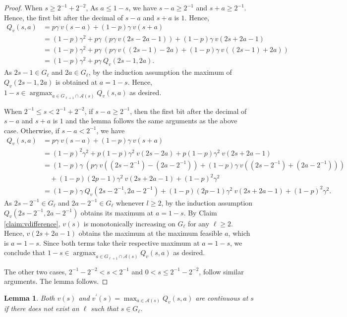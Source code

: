\documentclass{article}
\newtheorem{lemma}[theorem]{Lemma}
\theoremstyle{named}
\DeclareMathOperator*{\argmax}{arg max}
\newcommand{\cA}{\mathcal{A}}
\begin{document}
\begin{proof}
When $s \geq 2^{-1}+2^{-2}$, As $a\leq 1-s$, we have $s-a\geq 2^{-1}$ and $s+a\geq 2^{-1}$. Hence, the first bit after the decimal of $s-a$ and $s+a$ is $1$. 
Hence, 
\begin{align*}
Q_v(s,a) & = p\gamma\ v(s-a) + (1-p)\gamma\ v(s+a)\\
& = (1-p)\gamma^2 + p\gamma\ (p\gamma\ v(2s-2a-1)) + (1-p)\gamma\ v(2s+2a-1) \\
& = (1-p)\gamma^2 +  p\gamma\ (p\gamma\ v((2s-1)-2a) + (1-p)\gamma\ v((2s-1)+2a))\\
& = (1-p)\gamma^2 + p\gamma\ Q_v(2s-1,2a).
\end{align*}
As $2s-1\in G_\ell$ and $2a\in G_\ell$, by the induction assumption the maximum of $Q_v(2s-1,2a)$ is obtained at $a=1-s$. Hence, $1-s\in\argmax_{a\in G_{\ell+1}\cap \cA(s)}Q_v(s,a)$ as desired.

When $2^{-1} \le s < 2^{-1}+2^{-2}$, if $s-a\geq 2^{-1}$, then the first bit after the decimal of $s-a$ and $s+a$ is $1$ and the lemma follows the same arguments as the above case. Otherwise, if $s-a< 2^{-1}$, we have
\begin{align*}
Q_v(s,a) & = p\gamma\ v(s-a) + (1-p)\gamma\ v(s+a)\\ 
& = (1-p)^2\gamma^2 + p(1-p)\gamma^2\ v(2s-2a) + p(1-p)\gamma^2\  v(2s+2a-1)\\
& = (1-p)\gamma\ (p\gamma\ v((2s-2^{-1})-(2a-2^{-1}))+(1-p)\gamma\ v((2s-2^{-1})+(2a-2^{-1}))) \\
& \quad + (1-p)(2p-1)\gamma^2\ v(2s+2a-1) + (1-p)^2\gamma^2\\
& = (1-p)\gamma\ Q_v(2s-2^{-1},2a-2^{-1})+ (1-p)(2p-1)\gamma^2\ v(2s+2a-1) + (1-p)^2\gamma^2.
\end{align*}
As $2s-2^{-1}\in G_\ell$ and $2a-2^{-1}\in G_\ell$ whenever $l\geq 2$, by the induction assumption $Q_v(2s-2^{-1},2a-2^{-1})$ obtains its maximum at $a=1-s$. By Claim \ref{claim:vdifference}, $v(s)$ is monotonically increasing on $G_{\ell}$ for any $\ell\ge 2$. Hence, $v(2s+2a-1)$ obtains the maximum at the maximum feasible $a$, which is $a=1-s$. Since both terms take their respective maximum at $a=1-s$, we conclude that $1-s\in\argmax_{a\in G_{\ell+1}\cap \cA(s)}Q_v(s,a)$ as desired. 

The other two cases, $2^{-1}-2^{-2} < s < 2^{-1}$ and $0<s \le 2^{-1}-2^{-2}$, follow similar arguments. The lemma follows.
\end{proof}

\begin{lemma}
\label{continuous}
Both $v(s)$ and $v^\prime(s)=\max_{a\in\cA(s)} Q_v(s,a)$ are continuous at $s$ if there does not exist an $\ell$ such that $s\in G_\ell$.
\end{lemma}
\end{document}
